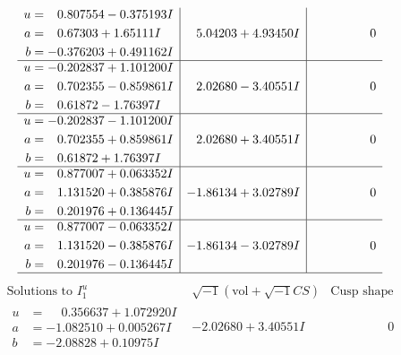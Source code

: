 \documentclass[1p]{elsarticle_modified}
\theoremstyle{definition}
\newcommand{\I}{\sqrt{-1}}
\begin{document}
$$\begin{array}{c|c|c}
\begin{aligned}
u &= \phantom{-}0.807554 - 0.375193 I \\
a &= \phantom{-}0.67303 + 1.65111 I \\
b &= -0.376203 + 0.491162 I\end{aligned}
 & \phantom{-}5.04203 + 4.93450 I & \phantom{-0.000000 } 0 \\ \hline\begin{aligned}
u &= -0.202837 + 1.101200 I \\
a &= \phantom{-}0.702355 - 0.859861 I \\
b &= \phantom{-}0.61872 - 1.76397 I\end{aligned}
 & \phantom{-}2.02680 - 3.40551 I & \phantom{-0.000000 } 0 \\ \hline\begin{aligned}
u &= -0.202837 - 1.101200 I \\
a &= \phantom{-}0.702355 + 0.859861 I \\
b &= \phantom{-}0.61872 + 1.76397 I\end{aligned}
 & \phantom{-}2.02680 + 3.40551 I & \phantom{-0.000000 } 0 \\ \hline\begin{aligned}
u &= \phantom{-}0.877007 + 0.063352 I \\
a &= \phantom{-}1.131520 + 0.385876 I \\
b &= \phantom{-}0.201976 + 0.136445 I\end{aligned}
 & -1.86134 + 3.02789 I & \phantom{-0.000000 } 0 \\ \hline\begin{aligned}
u &= \phantom{-}0.877007 - 0.063352 I \\
a &= \phantom{-}1.131520 - 0.385876 I \\
b &= \phantom{-}0.201976 - 0.136445 I\end{aligned}
 & -1.86134 - 3.02789 I & \phantom{-0.000000 } 0\\
 \hline 
 \end{array}$$\newpage$$\begin{array}{c|c|c}  
\text{Solutions to }I^u_{1}& \I (\text{vol} + \sqrt{-1}CS) & \text{Cusp shape}\\
 \hline 
\begin{aligned}
u &= \phantom{-}0.356637 + 1.072920 I \\
a &= -1.082510 + 0.005267 I \\
b &= -2.08828 + 0.10975 I\end{aligned}
 & -2.02680 + 3.40551 I & \phantom{-0.000000 } 0 \\ \hline\begin{aligned}

\end{aligned}
\end{array}$$
\end{document}

